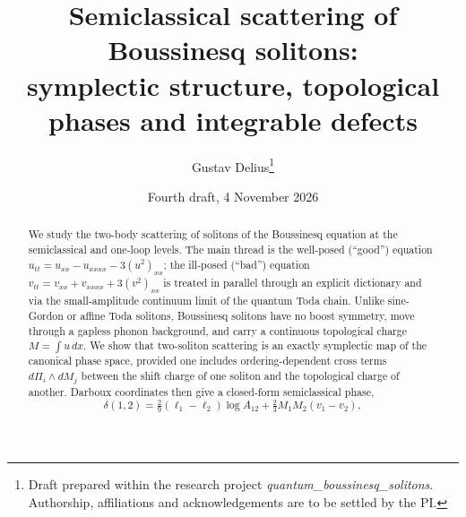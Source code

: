\documentclass[11pt,a4paper]{article}
\title{Semiclassical scattering of Boussinesq solitons:\\ symplectic structure, topological phases and integrable defects}
\author{Gustav Delius\thanks{Draft prepared within the research project \emph{quantum\_boussinesq\_solitons}. Authorship, affiliations and acknowledgements are to be settled by the PI.}}
\date{Fourth draft, 4 November 2026}
\theoremstyle{remark}
\begin{document}
\maketitle

\begin{abstract}
We study the two-body scattering of solitons of the Boussinesq equation at the semiclassical and one-loop levels. The main thread is the well-posed (``good'') equation $u_{tt}=u_{xx}-u_{xxxx}-3(u^2)_{xx}$; the ill-posed (``bad'') equation $v_{tt}=v_{xx}+v_{xxxx}+3(v^2)_{xx}$ is treated in parallel through an explicit dictionary and via the small-amplitude continuum limit of the quantum Toda chain. Unlike sine-Gordon or affine Toda solitons, Boussinesq solitons have no boost symmetry, move through a gapless phonon background, and carry a continuous topological charge $M=\int u\,dx$. We show that two-soliton scattering is an exactly symplectic map of the canonical phase space, provided one includes ordering-dependent cross terms $d\Pi_i\wedge dM_j$ between the shift charge of one soliton and the topological charge of another. Darboux coordinates then give a closed-form semiclassical phase,
\[
\delta(1,2)=\tfrac29(\ell_1-\ell_2)\log A_{12}+\tfrac23M_1M_2(v_1-v_2),
\]

\end{abstract}
\end{document}
